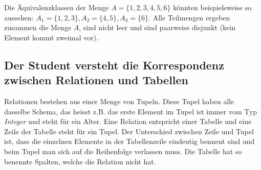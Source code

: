 Die Äquivalenzklassen der Menge $A=\{1, 2, 3, 4, 5, 6\}$ könnten beispielsweise so aussehen: $A_1=\{1, 2, 3\}, A_2=\{4, 5\}, A_3=\{6\}$. Alle Teilmengen ergeben zusammen die Menge $A$, sind nicht leer und sind paarweise disjunkt (kein Element kommt zweimal vor). 

\subsection{Der Student versteht die Korrespondenz zwischen Relationen und Tabellen}

Relationen bestehen aus einer Menge von Tupeln. Diese Tupel haben alle dasselbe Schema, das heisst z.B. das erste Element im Tupel ist immer vom Typ \emph{Integer} und steht für ein Alter. Eine Relation entspricht einer Tabelle und eine Zeile der Tabelle steht für ein Tupel. Der Unterschied zwischen Zeile und Tupel ist, dass die einzelnen Elemente in der Tabellenzeile eindeutig bennent sind und beim Tupel man sich auf die Reihenfolge verlassen muss. Die Tabelle hat so benennte Spalten, welche die Relation nicht hat.